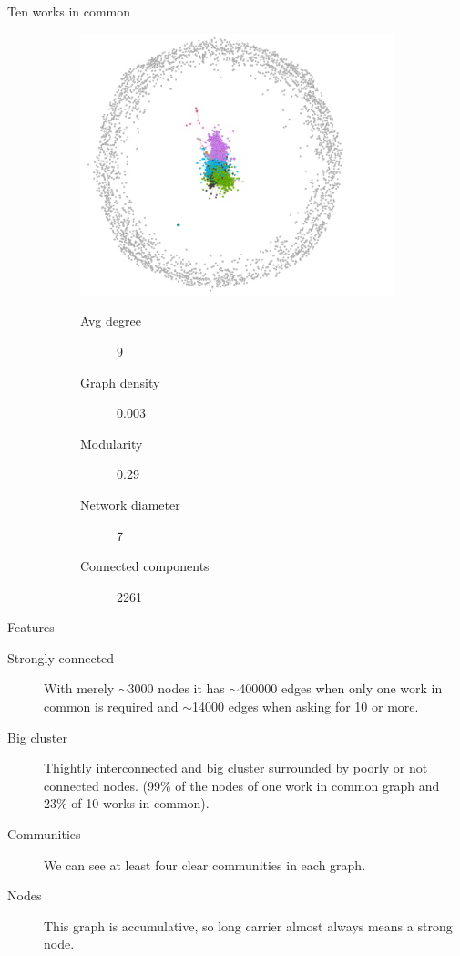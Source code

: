 \begin{frame}{Ten works in common}
\begin{figure}
	\begin{subfigure}{.55\linewidth}
		\includegraphics[scale=0.55, left]{graphics/atLeast10WorksCommunity.png} 
	\end{subfigure}%
	\begin{subfigure}{.45\linewidth}
		\begin{description}
		\item[Avg degree] 9
		\item[Graph density] 0.003
		\item[Modularity] 0.29
		\item[Network diameter] 7
		\item[Connected components] 2261
		\end{description}
	\end{subfigure}
\end{figure}
\end{frame}

\begin{frame}{Features}
\begin{description}
	\item [Strongly connected] With merely $\sim$3000 nodes it has $\sim$400000 edges when only one work in common is required and $\sim$14000 edges when asking for 10 or more. 
	\item [Big cluster] Thightly interconnected and big cluster surrounded by poorly or not connected nodes. (99\% of the nodes of one work in common graph and 23\% of 10 works in common). 
	\item [Communities] We can see at least four clear communities in each graph.
	\item [Nodes] This graph is accumulative, so long carrier almost always means a strong node.
\end{description}
\end{frame}

